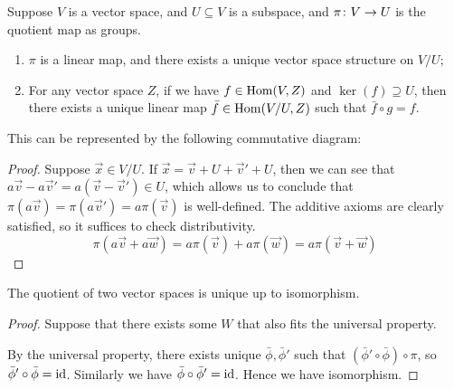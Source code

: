 \begin{proposition}\label{prop:univ-prop-quotient-vsp}
    Suppose \(V\) is a vector space, and \(U \subseteq V\) is a subspace,
    and \(\pi\colon V\to U\) is the quotient map as groups.
    \begin{enumerate}[label={(\alph*)}, itemsep=0mm]
        \item \(\pi\) is a linear map, and there exists a unique vector space structure on \(V/U\);
        \item For any vector space \(Z\), if we have \(f \in \operatorname{Hom}(V,Z)\) and \(\ker(f) \supseteq U\),
            then there exists a unique linear map \(\bar{f} \in \operatorname{Hom}(V/U,Z)\)
            such that \(\bar{f} \circ g = f\).
    \end{enumerate}

    This can be represented by the following commutative diagram:
    \begin{center}
    \end{center}
\end{proposition}
\begin{proof}
    Suppose \(\vec{x} \in V/U\).
    If \(\vec{x} = \vec{v} + U + \vec{v}' + U\),
    then we can see that \(a\vec{v}-a\vec{v}' = a(\vec{v}-\vec{v}') \in U\),
    which allows us to conclude that \(\pi(a\vec{v}) = \pi(a\vec{v}') = a\pi(\vec{v})\)
    is well-defined.
    The additive axioms are clearly satisfied,
    so it suffices to check distributivity.
    \begin{equation*}
        \pi(a\vec{v}+a\vec{w}) = a\pi(\vec{v}) + a\pi(\vec{w})
        = a\pi(\vec{v} +\vec{w})
    \end{equation*}
\end{proof}
\begin{theorem}
    The quotient of two vector spaces is unique up to isomorphism.
\end{theorem}
\begin{proof}
    Suppose that there exists some \(W\) that also fits the universal property.
    \begin{center}
    \end{center}
    By the universal property, there exists unique \(\bar{\phi},\bar{\phi}'\)
    such that \((\bar{\phi}'\circ\bar{\phi})\circ\pi\),
    so \(\bar{\phi}'\circ\bar{\phi} = \operatorname{id}\).
    Similarly we have \(\bar{\phi}\circ\bar{\phi}' = \operatorname{id}\).
    Hence we have isomorphism.
\end{proof}

